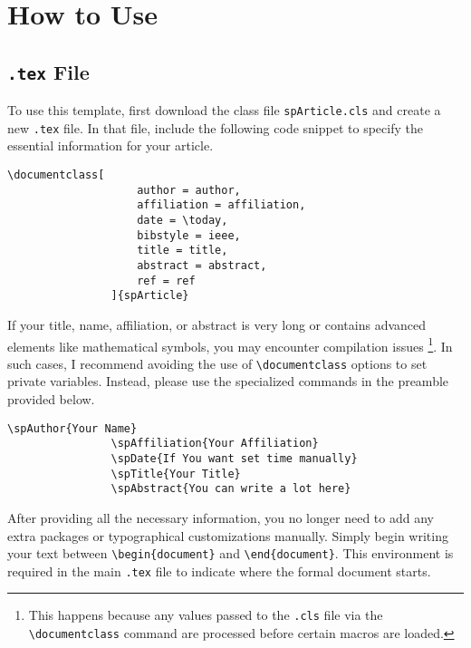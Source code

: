 \documentclass[
    bibstyle = apa,
    mathfont = cmbridge
]{spArticle}
\begin{document}
    \section{How to Use}
        \subsection{\texttt{.tex} File}
            To use this template, first download the class file \texttt{spArticle.cls} and create a new \texttt{.tex} file. In that file, include the following code snippet to specify the essential information for your article.
            \begin{Verbatim}[xleftmargin=-50pt]
                \documentclass[
                    author = author,
                    affiliation = affiliation,
                    date = \today,
                    bibstyle = ieee,
                    title = title,
                    abstract = abstract,
                    ref = ref
                ]{spArticle}
            \end{Verbatim}

            If your title, name, affiliation, or abstract is very long or contains advanced elements like mathematical symbols, you may encounter compilation issues \footnote{This happens because any values passed to the \texttt{.cls} file via the \texttt{\textbackslash documentclass} command are processed before certain macros are loaded.}. In such cases, I recommend avoiding the use of \texttt{\textbackslash documentclass} options to set private variables. Instead, please use the specialized commands in the preamble provided below.
            \begin{Verbatim}[xleftmargin=-70pt]
                \spAuthor{Your Name}
                \spAffiliation{Your Affiliation}
                \spDate{If You want set time manually}
                \spTitle{Your Title}
                \spAbstract{You can write a lot here}
            \end{Verbatim}

            After providing all the necessary information, you no longer need to add any extra packages or typographical customizations manually. Simply begin writing your text between \texttt{\textbackslash begin\{document\}} and \texttt{\textbackslash end\{document\}}. This environment is required in the main \texttt{.tex} file to indicate where the formal document starts.
\end{document}
